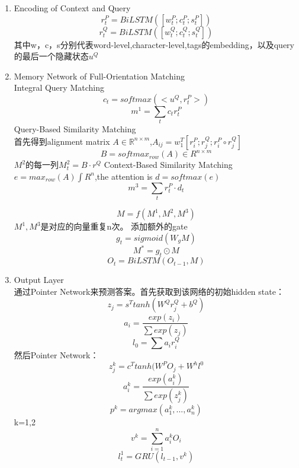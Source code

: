 \documentclass[a4paper,UTF8]{article}
\numberwithin{equation}{section}
\begin{document}
\begin{enumerate}
	\item Encoding of Context and Query\\
	$$r_t^P=BiLSTM([w_t^P;c_t^P;s_t^P])$$ 
	$$r_t^Q=BiLSTM([w_t^Q;c_t^Q;s_t^Q])$$
	其中w，c，s分别代表word-level,character-level,tags的embedding，以及query的最后一个隐藏状态$u^Q$
	\item Memory Network of Full-Orientation Matching\\
	\subitem[1] Integral Query Matching\\
	$$c_t = softmax(<u^Q,r_t^P>)$$
	$$m^1=\sum_tc_tr_t^P$$
	\subitem[2] Query-Based Similarity Matching \\
	首先得到alignment matrix $A \in \mathbb{R}^{n\times m}$,$A_{ij}=w_1^T[r_i^P;r_j^Q;r_i^P\circ r_j^Q]$
	$$B = softmax_{row}(A) \in R^{n\times m}$$
	$M^2$的每一列$M^2_t=B \cdot r^Q$
	\subitem[3] Context-Based Similarity Matching \\
	$e=max_{row}(A) \int R^n$,the attention is $d=softmax(e)$
	$$m^3=\sum_tr_t^P\cdot d_t$$

	$$M=f(M^1,M^2,M^3)$$
	$M^1,M^3$是对应的向量重复n次。
	添加额外的gate$$g_t=sigmoid(W_gM)$$ $$M^*=g_t \odot M$$
	$$O_t = BiLSTM(O_{t-1},M)$$
	\item Output Layer\\
	通过Pointer Network来预测答案。首先获取到该网络的初始hidden state：$$z_j=s^Ttanh(W^Qr_j^Q+b^Q)$$
	$$a_i = \frac{exp(z_i)}{\sum exp(z_j)}$$
	$$l_0=\sum a_ir_i^Q$$
	然后Pointer Network：$$z_j^k=c^Ttanh(W^PO_j+W^hl^0$$
	$$a_i^k=\frac{exp(a_i^k)}{\sum exp(z_j^k)}$$
	$$p^k=argmax(a_1^k,...,a_n^k)$$
	k=1,2
	$$v^k=\sum_{i=1}^n a_i^kO_i$$
	$$l_t^1=GRU(l_{t-1},v^k)$$
\end{enumerate}

\newpage
\end{document}
